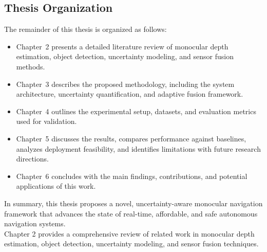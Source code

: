 \documentclass[12pt,oneside]{book}
\begin{document}
\begin{samepage}
\section{Thesis Organization}
The remainder of this thesis is organized as follows:
\begin{itemize}
    \item Chapter~2 presents a detailed literature review of monocular depth estimation, object detection, uncertainty modeling, and sensor fusion methods.
    \item Chapter~3 describes the proposed methodology, including the system architecture, uncertainty quantification, and adaptive fusion framework.
    \item Chapter~4 outlines the experimental setup, datasets, and evaluation metrics used for validation.
    \item Chapter~5 discusses the results, compares performance against baselines, analyzes deployment feasibility, and identifies limitations with future research directions.
    \item Chapter~6 concludes with the main findings, contributions, and potential applications of this work.
\end{itemize}

\end{samepage}

In summary, this thesis proposes a novel, uncertainty-aware monocular navigation framework that advances the state of real-time, affordable, and safe autonomous navigation systems.
\vspace{2cm}\\
Chapter 2 provides a comprehensive review of related work in monocular depth estimation, object detection, uncertainty modeling, and sensor fusion techniques.
\let\section\oldsection
\end{document}
